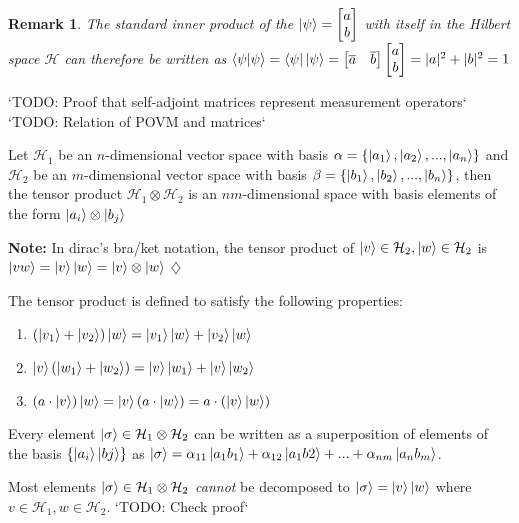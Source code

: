 \documentclass[12pt,twoside,fleqn]{report}
\theoremstyle{thmstyle}
\newtheorem{remark}{Remark}[chapter]
\newenvironment{note}{\textbf{Note:}}{\hfill\ensuremath{\diamondsuit}}
\begin{document}
\begin{remark}
The standard inner product of the $\ket{\psi} = \begin{bmatrix} a \\ b \end{bmatrix}$ with itself in the Hilbert space $\mathcal{H}$ can therefore be written as $\braket{\psi | \psi} = \bra{\psi}\ket{\psi} = \begin{bmatrix} \overline{a} & \overline{b}\end{bmatrix} \begin{bmatrix} a \\ b \end{bmatrix} = |a|^2 + |b|^2 = 1$
\end{remark}

`TODO: Proof that self-adjoint matrices represent measurement operators`
`TODO: Relation of POVM and matrices`

Let $\mathcal{H}_1$ be an $n$-dimensional vector space with basis $\alpha = \{ \ket{a_1}, \ket{a_2}, ..., \ket{a_n} \}$ and $\mathcal{H}_2$ be an $m$-dimensional vector space with basis $\beta = \{ \ket{b_1}, \ket{b_2}, ..., \ket{b_n} \}$, then the tensor product $\mathcal{H}_1 \otimes \mathcal{H}_2$ is an $nm$-dimensional space with basis elements of the form $\ket{a_i} \otimes \ket{b_j}$

\begin{note}
    In dirac's bra/ket notation, the tensor product of $\ket{v} \in \mathcal{H}_2, \ket{w} \in \mathcal{H}_2$ is $\ket{vw} = \ket{v}\ket{w} = \ket{v} \otimes \ket{w}$
\end{note}

The tensor product is defined to satisfy the following properties:
\begin{enumerate}
    \item $(\ket{v_1} + \ket{v_2} ) \ket{w} = \ket{v_1}\ket{w} + \ket{v_2}\ket{w}$
    \item $\ket{v}(\ket{w_1} + \ket{w_2}) =  \ket{v}\ket{w_1} + \ket{v}\ket{w_2}$
    \item $(a \cdot \ket{v})\ket{w} = \ket{v}(a \cdot \ket{w})  = a \cdot (\ket{v}\ket{w})$
\end{enumerate}
Every element $\ket{\sigma} \in \mathcal{H}_1 \otimes \mathcal{H}_2$ can be written as a superposition of elements of the basis $\{ \ket{a_i}\ket{bj} \}$ as $\ket{\sigma} = \alpha_{11} \ket{a_1 b_1} + \alpha_{12} \ket{a_1 b2} + ... + \alpha_{nm} \ket{a_n b_m}$.

Most elements $\ket{\sigma} \in \mathcal{H}_1 \otimes \mathcal{H}_2$ \textit{cannot} be decomposed to $\ket{\sigma} = \ket{v}\ket{w}$ where $v \in \mathcal{H}_1, w \in \mathcal{H}_2$.
`TODO: Check proof`
\end{document}
